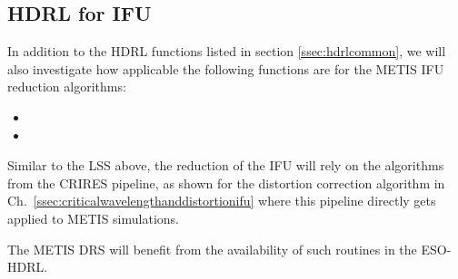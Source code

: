 \subsection{HDRL for IFU}
\label{ssec:hdrllms}

In addition to the HDRL functions listed in section \ref{ssec:hdrlcommon}, we will also investigate how applicable the following functions are for the METIS IFU reduction algorithms:
\begin{itemize}
    \item {}
    \item {}
\end{itemize}

Similar to the LSS above, the reduction of the IFU will rely on the algorithms
from the \ac{CRIRES} pipeline, as shown for the distortion correction algorithm
in Ch.~\ref{ssec:criticalwavelengthanddistortionifu} where this pipeline
directly gets applied to METIS simulations.

The METIS \ac{DRS} will benefit from the availability of such routines in the ESO-HDRL.

